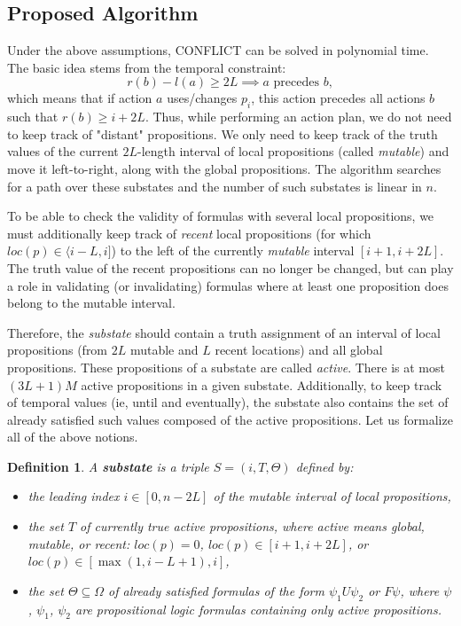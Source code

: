 \documentclass[a4paper,fleqn]{cas-dc}
\newtheorem{Definition}{Definition}
\begin{document}
\subsection{Proposed Algorithm}\label{pa}

Under the above assumptions, CONFLICT can be solved in polynomial time. 
The basic idea stems from the temporal constraint:
    $$r(b)-l(a)\ge 2L \implies a \text{ precedes } b,$$ which means
that if action \( a \) uses/changes \( p_i \),
this action precedes all actions \( b \) such that \( r(b) \geq i + 2L \).
Thus, while performing an action plan, we do not need to keep track of "distant" propositions.
We only need to keep track of the truth values of the current $2L$-length interval of
local propositions (called {\it mutable})
and move it left-to-right, along with the global propositions.
The algorithm searches for a path over these substates and the number of such substates is linear in $n$. 

To be able to check the validity of formulas with several local propositions, we must additionally keep track of {\it recent} local propositions (for which $loc(p)\in\langle i-L,i]$) to the left of the currently {\it mutable} interval $[i+1, i+2L]$. The truth value of the recent propositions can no longer be changed, but can play a role in validating (or invalidating) formulas where at least one proposition does belong to the mutable interval.

    Therefore, the {\it substate} should contain a truth assignment of an interval of local propositions (from $2L$ mutable and $L$ recent locations) and all global propositions. These propositions of a substate are called {\it active}. There is at most $(3L+1)M$ active propositions in a given substate.
    Additionally, to keep track of temporal values (ie, until and eventually), 
the substate also contains the set of already satisfied such values composed of the active propositions.
Let us formalize all of the above notions.

\begin{Definition}
    A {\bf substate} is a triple $S=(i, T, \Theta)$ defined by:
\begin{itemize}
    \item the leading index $i\in [0, n-2L]$ of the mutable interval of local propositions,
    \item the set $T$ of currently true active propositions, where {\it active} means global, mutable, or recent: $loc(p)=0$, $loc(p)\in[i+1,i+2L]$, or $loc(p)\in[\max(1, i-L+1), i]$,
    \item the set $\Theta \subseteq \Omega$ of already satisfied formulas of the form $\psi_1 U \psi_2$ or $F\psi$, where $\psi$, $\psi_1$, $\psi_2$ are propositional logic formulas containing only active propositions.
\end{itemize}
\end{Definition}
\end{document}
